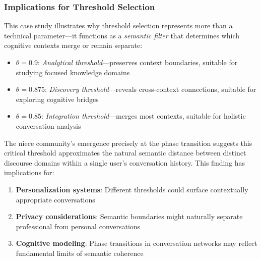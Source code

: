 \subsubsection{Implications for Threshold Selection}

This case study illustrates why threshold selection represents more than a technical parameter—it functions as a \emph{semantic filter} that determines which cognitive contexts merge or remain separate:

\begin{itemize}
    \item \textbf{$\theta = 0.9$}: \emph{Analytical threshold}—preserves context boundaries, suitable for studying focused knowledge domains
    \item \textbf{$\theta = 0.875$}: \emph{Discovery threshold}—reveals cross-context connections, suitable for exploring cognitive bridges
    \item \textbf{$\theta = 0.85$}: \emph{Integration threshold}—merges most contexts, suitable for holistic conversation analysis
\end{itemize}

The niece community's emergence precisely at the phase transition suggests this critical threshold approximates the natural semantic distance between distinct discourse domains within a single user's conversation history. This finding has implications for:

\begin{enumerate}
    \item \textbf{Personalization systems}: Different thresholds could surface contextually appropriate conversations
    \item \textbf{Privacy considerations}: Semantic boundaries might naturally separate professional from personal conversations
    \item \textbf{Cognitive modeling}: Phase transitions in conversation networks may reflect fundamental limits of semantic coherence
\end{enumerate}